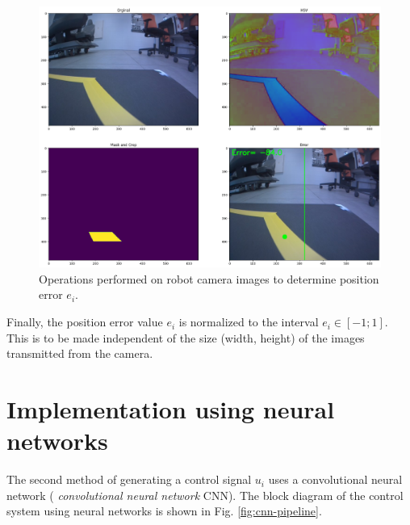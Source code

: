 \documentclass[conference]{IEEEtran}
\begin{document}
\begin{figure}[hbt!]
    \centering
    \includegraphics[width=.95\columnwidth]{img-transformation.png}
    \caption{Operations performed on robot camera images to determine position error  $e_i$.}
    \label{fig:img-transformation-summary}
\end{figure}

Finally, the position error value $e_i$ is normalized to the interval $e_i \in [-1;1]$. This is to be made independent of the size (width, height) of the images transmitted from the camera.


\section{Implementation using neural networks}\label{sec:nn-controller}
The second method of generating a control signal $u_i$ uses a convolutional neural network (\emph{ convolutional neural network} CNN). The block diagram of the control system using neural networks is shown in Fig. \ref{fig:cnn-pipeline}.
\end{document}
